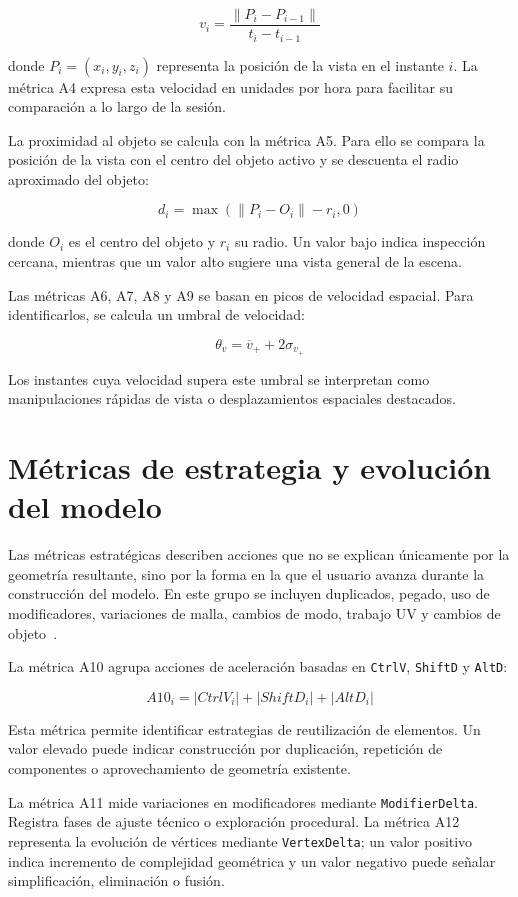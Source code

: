 \[
v_i = \frac{\lVert P_i - P_{i-1} \rVert}{t_i - t_{i-1}}
\]

donde $P_i=(x_i,y_i,z_i)$ representa la posición de la vista en el instante $i$. La métrica A4 expresa esta velocidad en unidades por hora para facilitar su comparación a lo largo de la sesión.

La proximidad al objeto se calcula con la métrica A5. Para ello se compara la posición de la vista con el centro del objeto activo y se descuenta el radio aproximado del objeto:

\[
d_i = \max(\lVert P_i - O_i \rVert - r_i, 0)
\]

donde $O_i$ es el centro del objeto y $r_i$ su radio. Un valor bajo indica inspección cercana, mientras que un valor alto sugiere una vista general de la escena.

Las métricas A6, A7, A8 y A9 se basan en picos de velocidad espacial. Para identificarlos, se calcula un umbral de velocidad:

\[
\theta_v = \overline{v}_{+} + 2\sigma_{v_{+}}
\]

Los instantes cuya velocidad supera este umbral se interpretan como manipulaciones rápidas de vista o desplazamientos espaciales destacados.

\section{Métricas de estrategia y evolución del modelo}

Las métricas estratégicas describen acciones que no se explican únicamente por la geometría resultante, sino por la forma en la que el usuario avanza durante la construcción del modelo. En este grupo se incluyen duplicados, pegado, uso de modificadores, variaciones de malla, cambios de modo, trabajo UV y cambios de objeto~\cite{gao2021,liu2022}.

La métrica A10 agrupa acciones de aceleración basadas en \texttt{CtrlV}, \texttt{ShiftD} y \texttt{AltD}:

\[
A10_i = |CtrlV_i| + |ShiftD_i| + |AltD_i|
\]

Esta métrica permite identificar estrategias de reutilización de elementos. Un valor elevado puede indicar construcción por duplicación, repetición de componentes o aprovechamiento de geometría existente.

La métrica A11 mide variaciones en modificadores mediante \texttt{ModifierDelta}. Registra fases de ajuste técnico o exploración procedural. La métrica A12 representa la evolución de vértices mediante \texttt{VertexDelta}; un valor positivo indica incremento de complejidad geométrica y un valor negativo puede señalar simplificación, eliminación o fusión.

